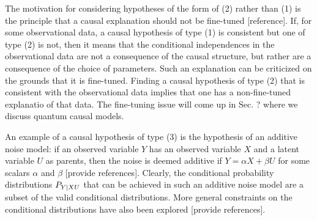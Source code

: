 The motivation for considering hypotheses of the form of (2) rather than (1) is the principle that a causal explanation should not be fine-tuned [reference].  If, for some observational data, a causal hypothesis of type (1) is consistent but one of type (2) is not, then it means that the conditional independences in the observational data are not a consequence of the causal structure, but rather are a consequence of the choice of parameters.  Such an explanation can be criticized on the grounds that it is fine-tuned.  Finding a causal hypothesis of type (2) that is consistent with the observational data implies that one has a non-fine-tuned explanatio of that data.  The fine-tuning issue will come up in Sec. ? where we discuss quantum causal models. 



An example of a causal hypothesis of type (3) is the hypothesis of an additive noise model: if an observed variable $Y$ has an observed variable $X$ and a latent variable $U$ as parents, then the noise is deemed additive if $Y=\alpha X + \beta U$ for some scalars $\alpha$ and $\beta$ [provide references].  Clearly, the conditional probability distributions $P_{Y|XU}$ that can be achieved in such an additive noise model are a subset of the valid conditional distributions.  More general constraints on the conditional distributions have also been explored [provide references].  

